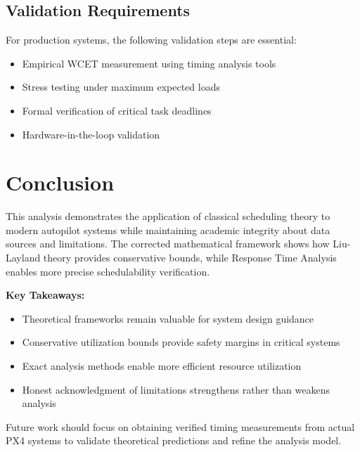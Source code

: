 \documentclass[12pt,a4paper]{article}
\begin{document}
\subsection{Validation Requirements}

For production systems, the following validation steps are essential:

\begin{itemize}
\item Empirical WCET measurement using timing analysis tools
\item Stress testing under maximum expected loads
\item Formal verification of critical task deadlines
\item Hardware-in-the-loop validation
\end{itemize}

\section{Conclusion}

This analysis demonstrates the application of classical scheduling theory to modern autopilot systems while maintaining academic integrity about data sources and limitations. The corrected mathematical framework shows how Liu-Layland theory provides conservative bounds, while Response Time Analysis enables more precise schedulability verification.

\textbf{Key Takeaways:}
\begin{itemize}
\item Theoretical frameworks remain valuable for system design guidance
\item Conservative utilization bounds provide safety margins in critical systems
\item Exact analysis methods enable more efficient resource utilization
\item Honest acknowledgment of limitations strengthens rather than weakens analysis
\end{itemize}

Future work should focus on obtaining verified timing measurements from actual PX4 systems to validate theoretical predictions and refine the analysis model.
\end{document}
